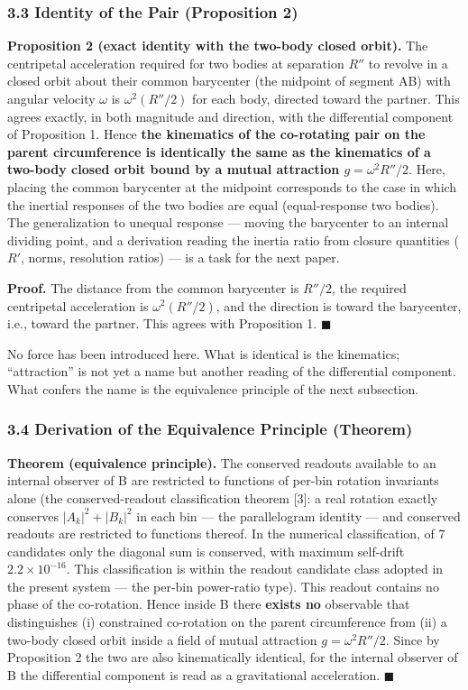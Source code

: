 \documentclass[
  a4paper,
]{article}
\begin{document}
\subsubsection{3.3 Identity of the Pair (Proposition
2)}\label{identity-of-the-pair-proposition-2}

\textbf{Proposition 2 (exact identity with the two-body closed orbit).}
The centripetal acceleration required for two bodies at separation
\(R''\) to revolve in a closed orbit about their common barycenter (the
midpoint of segment AB) with angular velocity \(\omega\) is
\(\omega^2(R''/2)\) for each body, directed toward the partner. This
agrees exactly, in both magnitude and direction, with the differential
component of Proposition 1. Hence \textbf{the kinematics of the
co-rotating pair on the parent circumference is identically the same as
the kinematics of a two-body closed orbit bound by a mutual attraction
\(g=\omega^2R''/2\)}. Here, placing the common barycenter at the
midpoint corresponds to the case in which the inertial responses of the
two bodies are equal (equal-response two bodies). The generalization to
unequal response --- moving the barycenter to an internal dividing
point, and a derivation reading the inertia ratio from closure
quantities (\(R'\), norms, resolution ratios) --- is a task for the next
paper.

\textbf{Proof.} The distance from the common barycenter is \(R''/2\),
the required centripetal acceleration is \(\omega^2(R''/2)\), and the
direction is toward the barycenter, i.e., toward the partner. This
agrees with Proposition 1. \(\blacksquare\)

No force has been introduced here. What is identical is the kinematics;
``attraction'' is not yet a name but another reading of the differential
component. What confers the name is the equivalence principle of the
next subsection.

\subsubsection{3.4 Derivation of the Equivalence Principle
(Theorem)}\label{derivation-of-the-equivalence-principle-theorem}

\textbf{Theorem (equivalence principle).} The conserved readouts
available to an internal observer of B are restricted to functions of
per-bin rotation invariants alone (the conserved-readout classification
theorem {[}3{]}: a real rotation exactly conserves \(|A_k|^2+|B_k|^2\)
in each bin --- the parallelogram identity --- and conserved readouts
are restricted to functions thereof. In the numerical classification, of
7 candidates only the diagonal sum is conserved, with maximum self-drift
\(2.2\times10^{-16}\). This classification is within the readout
candidate class adopted in the present system --- the per-bin
power-ratio type). This readout contains no phase of the co-rotation.
Hence inside B there \textbf{exists no} observable that distinguishes
(i) constrained co-rotation on the parent circumference from (ii) a
two-body closed orbit inside a field of mutual attraction
\(g=\omega^2R''/2\). Since by Proposition 2 the two are also
kinematically identical, for the internal observer of B the differential
component is read as a gravitational acceleration. \(\blacksquare\)
\end{document}
